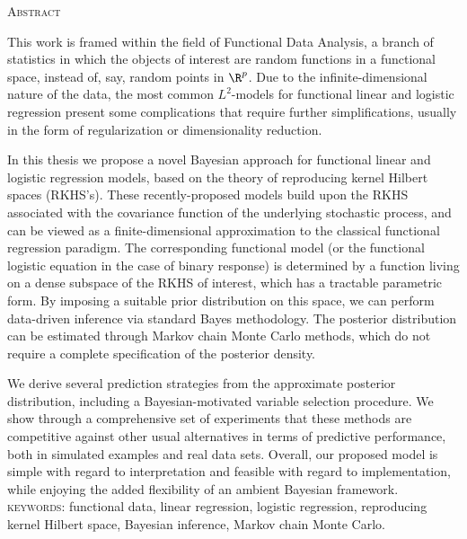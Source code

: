 %
%

\begin{center}
  \begin{Large}
  \textsc{Abstract}
\end{Large}
\end{center}

\noindent This work is framed within the field of Functional Data Analysis, a branch of statistics in which the objects of interest are random functions in a functional space, instead of, say, random points in \(\R^p\). Due to the infinite-dimensional nature of the data, the most common \(L^2\)-models for functional linear and logistic regression present some complications that require further simplifications, usually in the form of regularization or dimensionality reduction.

In this thesis we propose a novel Bayesian approach for functional linear and logistic regression models, based on the theory of reproducing kernel Hilbert spaces (RKHS's). These recently-proposed models build upon the RKHS associated with the covariance function of the underlying stochastic process, and can be viewed as a finite-dimensional approximation to the classical functional regression paradigm. The corresponding functional model (or the functional logistic equation in the case of binary response) is determined by a function living on a dense subspace of the RKHS of interest, which has a tractable parametric form. By imposing a suitable prior distribution on this space, we can perform data-driven inference via standard Bayes methodology. The posterior distribution can be estimated through Markov chain Monte Carlo methods, which do not require a complete specification of the posterior density.

We derive several prediction strategies from the approximate posterior distribution, including a Bayesian-motivated variable selection procedure. We show through a comprehensive set of experiments that these methods are competitive against other usual alternatives in terms of predictive performance, both in simulated examples and real data sets. Overall, our proposed model is simple with regard to interpretation and feasible with regard to implementation, while enjoying the added flexibility of an ambient Bayesian framework.\\

\noindent
\textsc{keywords:} functional data, linear regression, logistic regression, reproducing kernel Hilbert space, Bayesian inference, Markov chain Monte Carlo.
